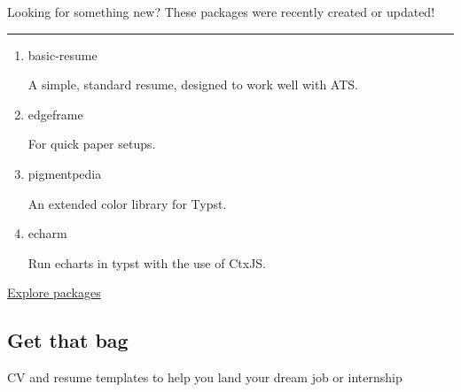 Looking for something new? These packages were recently created or
updated!

\begin{center}\rule{0.5\linewidth}{0.5pt}\end{center}

\begin{enumerate}
\item
  \href{https://typst.app/universe/package/basic-resume/}{}

  basic-resume

  A simple, standard resume, designed to work well with ATS.

  
\item
  \href{https://typst.app/universe/package/edgeframe/}{}

  edgeframe

  For quick paper setups.

  
\item
  \href{https://typst.app/universe/package/pigmentpedia/}{}

  pigmentpedia

  An extended color library for Typst.

  
\item
  \href{https://typst.app/universe/package/echarm/}{}

  echarm

  Run echarts in typst with the use of CtxJS.

  
\end{enumerate}

\href{https://typst.app/universe/search/?kind=packages}{Explore
packages}

\subsection{Get that bag}\label{get-that-bag}

CV and resume templates to help you land your dream job or internship

